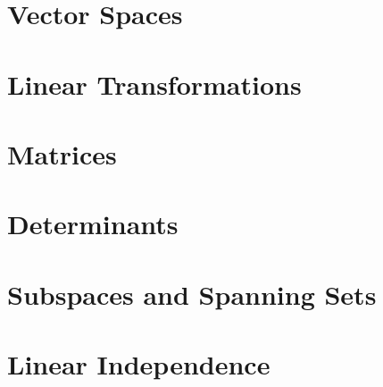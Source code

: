 \documentclass[12pt]{book}
\newcommand{\1}{{\mathrm 1\hspace*{-0.4ex}%
\rule{0.1ex}{1.52ex}\hspace*{0.2ex}}}
\begin{document}
\section{Vector Spaces}

%

%

%
\section{Linear Transformations}
%
%
%
%

%
\section{Matrices}

%

%
%
%
%
%

%

%
%

%


%

%

%

%

%

%

%
\section{Determinants}

%

%
%

%

%

%
%


%
%
%

%
\section{Subspaces and Spanning Sets}

%

%

%
\section{Linear Independence}

%

%

\end{document}
